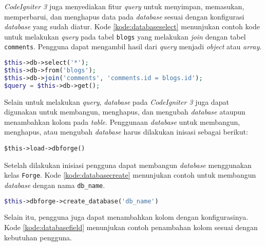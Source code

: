 \textit{CodeIgniter 3} juga menyediakan fitur \textit{query} untuk menyimpan, memasukan, memperbarui, dan menghapus data pada \textit{database} sesuai dengan konfigurasi \textit{database} yang sudah diatur. Kode \ref{kode:databaseselect} menunjukan contoh kode untuk melakukan \textit{query} pada tabel \texttt{blogs} yang melakukan \textit{join} dengan tabel \texttt{comments}. Pengguna dapat mengambil hasil dari \textit{query} menjadi \textit{object} atau \textit{array}.

\begin{lstlisting}[language=PHP, caption=Contoh penggunaan \textit{query}, label=kode:databaseselect]
$this->db->select('*');
$this->db->from('blogs');
$this->db->join('comments', 'comments.id = blogs.id');
$query = $this->db->get();
\end{lstlisting}

Selain untuk melakukan \textit{query}, \textit{database} pada \textit{CodeIgniter 3} juga dapat digunakan untuk membangun, menghapus, dan mengubah \textit{database} ataupun menambahkan kolom pada \textit{table}. Penggunaan \textit{database} untuk membangun, menghapus, atau mengubah \textit{database} harus dilakukan inisasi sebagai berikut:
\begin{center}
\verb|$this->load->dbforge()|
\end{center}
Setelah dilakukan inisiasi pengguna dapat membangun \textit{database} menggunakan kelas \texttt{Forge}. Kode \ref{kode:databasecreate} menunjukan contoh untuk membangun \textit{database} dengan nama \texttt{db\_name}.

\begin{lstlisting}[language=PHP, caption=Contoh membangun \textit{database} menggunakan \textit{CodeIgniter 3} , label=kode:databasecreate]
	$this->dbforge->create_database('db_name')
\end{lstlisting}

Selain itu, pengguna juga dapat menambahkan kolom dengan konfigurasinya. Kode \ref{kode:databasefield} menunjukan contoh penambahan kolom sesuai dengan kebutuhan pengguna.

